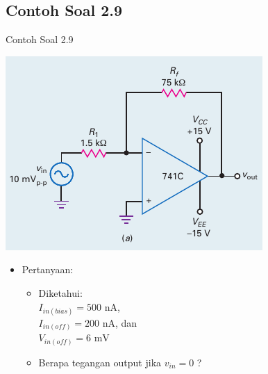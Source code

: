 \subsection{Contoh Soal 2.9}
\begin{frame}[t]{Contoh Soal 2.9}
	\begin{multicols}{2}
		\begin{center}
			\includegraphics[width=\linewidth]{gambar/fig-16.17a}
		\end{center}
		\columnbreak
		\begin{itemize}
			\item Pertanyaan:
			\begin{itemize}
				\item Diketahui: \\
				$ I_{in(bias)} = 500 \text{ nA} $, \\
				$ I_{in(off)} = 200 \text{ nA}$, dan \\
				$ V_{in(off)} = 6 \text{ mV} $
				\item Berapa tegangan output jika $ v_{in} = 0 $ ?
			\end{itemize}
		\end{itemize}
	\end{multicols}
\end{frame}

